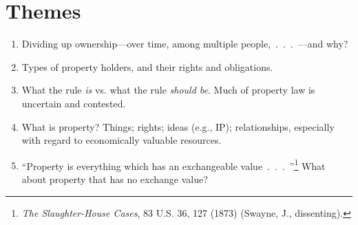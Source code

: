 \section{Themes}

\begin{enumerate}
    \item Dividing up ownership---over time, among multiple 
    people,~.~.~.~---and why?
    \item Types of property holders, and their rights and obligations.
    \item What the rule \emph{is} vs. what the rule \emph{should be}. Much of 
    property law is uncertain and contested.
    \item What is property? Things; rights; ideas (e.g., IP); relationships, 
    especially with regard to economically valuable resources.
    \item ``Property is everything which has an exchangeable 
    value~.~.~.~''\footnote{\emph{The Slaughter-House Cases}, 83 U.S. 36, 127 
    (1873) (Swayne, J., dissenting).} What about property that has no exchange value?
\end{enumerate}

